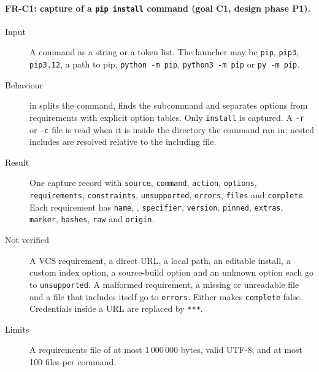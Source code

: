\paragraph{FR-C1: capture of a \texttt{pip install} command (goal C1, design phase P1).}
\begin{sloppypar}
\begin{description}
    \item[Input] A command as a string or a token list. The launcher may be \texttt{pip}, \texttt{pip3}, \texttt{pip3.12}, a path to pip, \texttt{python -m pip}, \texttt{python3 -m pip} or \texttt{py -m pip}.
    \item[Behaviour]  in  splits the command, finds the subcommand and separates options from requirements with explicit option tables. Only \texttt{install} is captured. A \texttt{-r} or \texttt{-c} file is read when it is inside the directory the command ran in; nested includes are resolved relative to the including file.
    \item[Result] One capture record with \texttt{source}, \texttt{command}, \texttt{action}, \texttt{options}, \texttt{requirements}, \texttt{constraints}, \texttt{unsupported}, \texttt{errors}, \texttt{files} and \texttt{complete}. Each requirement has \texttt{name}, , \texttt{specifier}, \texttt{version}, \texttt{pinned}, \texttt{extras}, \texttt{marker}, \texttt{hashes}, \texttt{raw} and \texttt{origin}.
    \item[Not verified] A VCS requirement, a direct URL, a local path, an editable install, a custom index option, a source-build option and an unknown option each go to \texttt{unsupported}. A malformed requirement, a missing or unreadable file and a file that includes itself go to \texttt{errors}. Either makes \texttt{complete} false. Credentials inside a URL are replaced by \texttt{***}.
    \item[Limits] A requirements file of at most 1\,000\,000 bytes, valid UTF-8, and at most 100 files per command.
\end{description}
\end{sloppypar}

